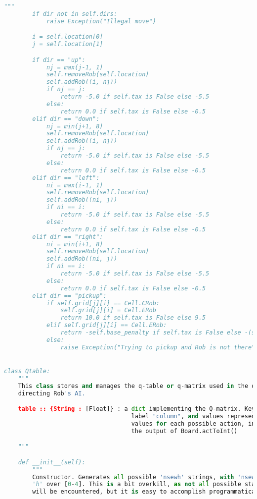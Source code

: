 \documentclass[12pt,a4paper]{article}
\begin{document}
\begin{lstlisting}[language=Python,numbers=none,basicstyle=\tiny]
        """
        if dir not in self.dirs:
            raise Exception("Illegal move")

        i = self.location[0]
        j = self.location[1]

        if dir == "up":
            nj = max(j-1, 1)
            self.removeRob(self.location)
            self.addRob((i, nj))
            if nj == j:
                return -5.0 if self.tax is False else -5.5
            else:
                return 0.0 if self.tax is False else -0.5
        elif dir == "down":
            nj = min(j+1, 8)
            self.removeRob(self.location)
            self.addRob((i, nj))
            if nj == j:
                return -5.0 if self.tax is False else -5.5
            else:
                return 0.0 if self.tax is False else -0.5
        elif dir == "left":
            ni = max(i-1, 1)
            self.removeRob(self.location)
            self.addRob((ni, j))
            if ni == i:
                return -5.0 if self.tax is False else -5.5
            else:
                return 0.0 if self.tax is False else -0.5
        elif dir == "right":
            ni = min(i+1, 8)
            self.removeRob(self.location)
            self.addRob((ni, j))
            if ni == i:
                return -5.0 if self.tax is False else -5.5
            else:
                return 0.0 if self.tax is False else -0.5
        elif dir == "pickup":
            if self.grid[j][i] == Cell.CRob:
                self.grid[j][i] = Cell.ERob
                return 10.0 if self.tax is False else 9.5
            elif self.grid[j][i] == Cell.ERob:
                return -self.base_penalty if self.tax is False else -(self.base_penalty+0.5)
            else:
                raise Exception("Trying to pickup and Rob is not there")


class Qtable:
    """
    This class stores and manages the q-table or q-matrix used in the q-learning algorithm
    directing Rob's AI.

    table :: {String : [Float]} : a dict implementing the Q-matrix. Keys represent the state
                                    label "column", and values represent the learned reward
                                    values for each possible action, indexed the same as
                                    the output of Board.actToInt()

    """

    def __init__(self):
        """
        Constructor. Generates all possible 'nsewh' strings, with 'nsew' over [0-2], and
        'h' over [0-4]. This is a bit overkill, as not all possible state combinations
        will be encountered, but it is easy to accomplish programmatically.


\end{lstlisting}
\end{document}
